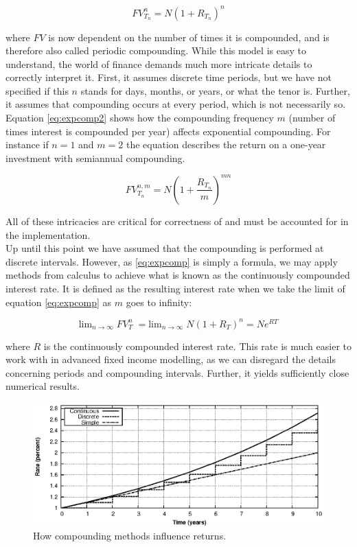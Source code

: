 \begin{equation}\label{eq:expcomp}
FV_{T_n}^n = N (1 + R_{T_n})^n
\end{equation}

where $FV$ is now dependent on the number of times it is compounded, and is 
therefore also called periodic compounding.
While this model is easy to understand, the world of finance demands much more 
intricate details to correctly interpret it. First, it assumes 
discrete time periods, but we have not specified if this $n$ stands for days, 
months, or years, or what the tenor is. Further, it assumes that compounding
occurs at every period, which is not necessarily so. Equation \ref{eq:expcomp2}
shows how the compounding frequency $m$ (number of times interest is compounded
per year) affects exponential compounding. For instance if $n=1$ and $m=2$ the
equation describes the return on a one-year investment with semiannual compounding.

\begin{equation}\label{eq:expcomp2}
FV_{T_n}^{n,m} = N (1 + \frac{R_{T_n}}{m})^{mn}
\end{equation}

All of these intricacies are critical for correctness of \hql and must
be accounted for in the implementation.\\

Up until this point we have assumed that the compounding is performed at 
discrete intervals. However, as \ref{eq:expcomp} is simply a formula, we may apply 
methods  from calculus to achieve what is known as the continuously compounded interest 
rate. It is defined as the resulting interest rate when we take the limit of 
equation \ref{eq:expcomp} as $m$ goes to infinity:

\begin{equation}
\text{lim}_{n \rightarrow \infty}\; FV_T^n \; = \text{lim}_{n \rightarrow \infty}\; N (1 + R_T)^n
= N e^{RT}
\end{equation}

where $R$ is the continuously compounded interest rate\cite{HULL}. This rate
is much easier to work with in advanced fixed income modelling\cite{cmunk}, 
as we can disregard the details concerning periods and compounding intervals.
Further, it yields sufficiently close numerical results.

\begin{figure}[!htb]
\centering
\includegraphics[scale=1.2]{images/comp02.eps}
\caption{How compounding methods influence returns.}
\label{fig:comp02}
\end{figure}

